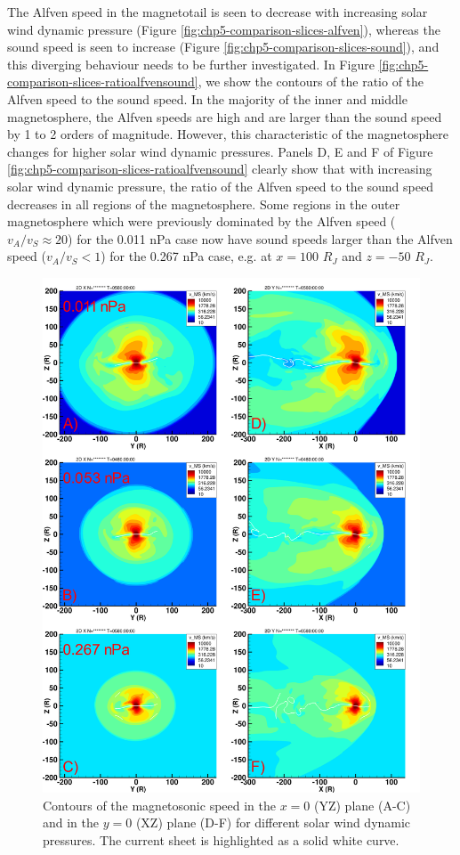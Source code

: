 The Alfven speed in the magnetotail is seen to decrease with increasing solar wind dynamic pressure (Figure \ref{fig:chp5-comparison-slices-alfven}), whereas the sound speed is seen to increase (Figure \ref{fig:chp5-comparison-slices-sound}), and this diverging behaviour needs to be further investigated. In Figure \ref{fig:chp5-comparison-slices-ratioalfvensound}, we show the contours of the ratio of the Alfven speed to the sound speed. In the majority of the inner and middle magnetosphere, the Alfven speeds are high and are larger than the sound speed by 1 to 2 orders of magnitude. However, this characteristic of the magnetosphere changes for higher solar wind dynamic pressures. Panels D, E and F of Figure \ref{fig:chp5-comparison-slices-ratioalfvensound} clearly show that with increasing solar wind dynamic pressure, the ratio of the Alfven speed to the sound speed decreases in all regions of the magnetosphere. Some regions in the outer magnetosphere which were previously dominated by the Alfven speed ($v_A/v_S \approx 20$) for the 0.011 nPa case now have sound speeds larger than the Alfven speed ($v_A/v_S < 1$) for the 0.267 nPa case, e.g. at $x=100$ $R_J$ and $z=-50$ $R_J$. 

\begin{figure}
    \centering
    \includegraphics[height=0.9\textheight]{images5/compare_runs_currentsheet_MagnetosonicSpeed.png}
    \caption{Contours of the magnetosonic speed in the $x=0$ (YZ) plane (A-C) and in the $y=0$ (XZ) plane (D-F) for different solar wind dynamic pressures. The current sheet is highlighted as a solid white curve.}
    \label{fig:chp5-comparison-slices-magnetosonic}
\end{figure}

